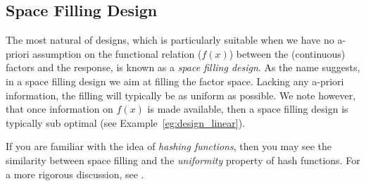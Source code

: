\subsection{Space Filling Design}
\label{sec:space_filling}
The most natural of designs, which is particularly suitable when we have no a-priori assumption on the functional relation ($f(x)$) between the (continuous) factors and the response, is known as a \emph{space filling design}.
As the name suggests, in a space filling design we aim at filling the factor space. Lacking any a-priori information, the filling will typically be as uniform as possible. 
We note however, that once information on $f(x)$ is made available, then a space filling design is typically sub optimal (see Example~\ref{eg:design_linear}).


\begin{extra}
	If you are familiar with the idea of \emph{hashing functions}, then you may see the similarity between space filling and the \emph{uniformity} property of hash functions. 
	For a more rigorous discussion, see \cite{hill_first_1986}.
\end{extra}



